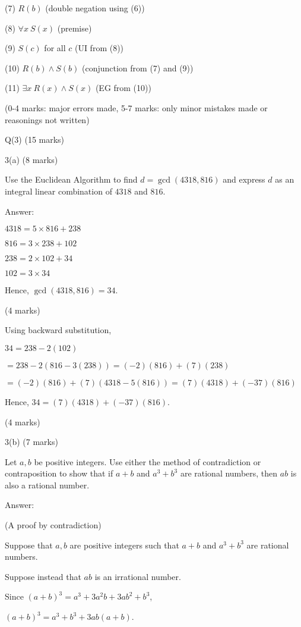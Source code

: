 \documentclass[a4paper,12pt,oneside]{book}
\theoremstyle{definition}
\begin{document}
(7) $R(b)$ (double negation using (6))

(8) $\forall x \ S(x)$ (premise)

(9) $S(c)$ for all $c$ (UI from (8))

(10) $R(b) \wedge S(b)$ (conjunction from (7) and (9))

(11) $\exists x \ R(x) \wedge S(x)$ (EG from (10))

(0-4 marks: major errors made, 5-7 marks: only minor mistakes made or reasonings not written)



\newpage

Q(3) (15 marks)

3(a) (8 marks)

Use the Euclidean Algorithm to find $d=\gcd(4318,816)$ and express $d$ as an integral linear combination of $4318$ and $816$.

Answer:

$4318 = 5 \times 816 + 238$

$816 = 3 \times 238 + 102$

$238 = 2 \times 102 + 34$

$102 = 3 \times 34$

Hence, $\gcd(4318,816) = 34$.

(4 marks)

Using backward substitution,

$34 = 238 - 2(102)$

$= 238 - 2(816 - 3(238)) = (-2)(816) + (7)(238)$

$= (-2)(816) + (7)(4318 - 5(816)) = (7)(4318) + (-37)(816)$

Hence, $34 = (7)(4318) + (-37)(816)$.

(4 marks)

3(b) (7 marks)

Let $a,b$ be positive integers. Use either the method of contradiction or contraposition to show that if $a+b$ and $a^3+b^3$ are rational numbers, then $ab$ is also a rational number.

Answer:

(A proof by contradiction)

Suppose that $a,b$ are positive integers such that  $a+b$ and $a^3+b^3$ are rational numbers.

Suppose instead that $ab$ is an irrational number.

Since $(a+b)^3 = a^3 + 3a^2 b + 3ab^2 + b^3$,

$(a+b)^3 = a^3 + b^3 + 3ab(a+b)$.
\end{document}
